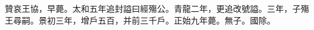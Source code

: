 
\begin{pinyinscope}
贊哀王協，早薨。太和五年追封謚曰經殤公。青龍二年，更追改號謚。三年，子殤王尋嗣。景初三年，增戶五百，并前三千戶。正始九年薨。無子。國除。


\end{pinyinscope}